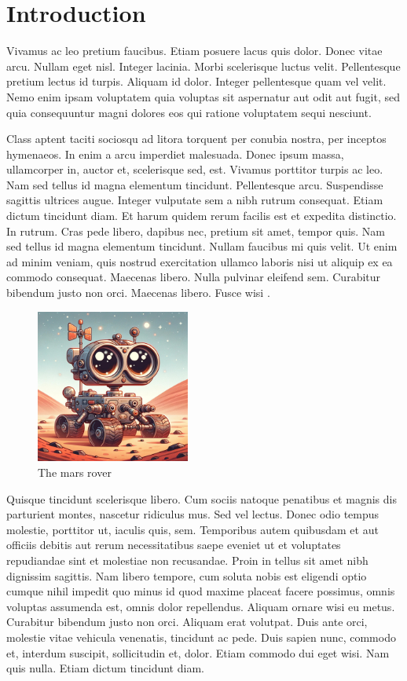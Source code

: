 \section{Introduction}

Vivamus ac leo pretium faucibus. Etiam posuere lacus quis dolor. Donec vitae arcu. Nullam eget nisl. Integer lacinia. Morbi scelerisque luctus velit. Pellentesque pretium lectus id turpis. Aliquam id dolor. Integer pellentesque quam vel velit. Nemo enim ipsam voluptatem quia voluptas sit aspernatur aut odit aut fugit, sed quia consequuntur magni dolores eos qui ratione voluptatem sequi nesciunt.

Class aptent taciti sociosqu ad litora torquent per conubia nostra, per inceptos hymenaeos. In enim a arcu imperdiet malesuada. Donec ipsum massa, ullamcorper in, auctor et, scelerisque sed, est. Vivamus porttitor turpis ac leo. Nam sed tellus id magna elementum tincidunt. Pellentesque arcu. Suspendisse sagittis ultrices augue. Integer vulputate sem a nibh rutrum consequat. Etiam dictum tincidunt diam. Et harum quidem rerum facilis est et expedita distinctio. In rutrum. Cras pede libero, dapibus nec, pretium sit amet, tempor quis. Nam sed tellus id magna elementum tincidunt. Nullam faucibus mi quis velit. Ut enim ad minim veniam, quis nostrud exercitation ullamco laboris nisi ut aliquip ex ea commodo consequat. Maecenas libero. Nulla pulvinar eleifend sem. Curabitur bibendum justo non orci. Maecenas libero. Fusce wisi \cite{kalman1960new}.

\begin{figure}[h]
    \centering
    \includegraphics[width=0.45\textwidth]{images/rover.jpg}
    \caption{The mars rover}
    \label{fig:mars_rover}
\end{figure}

Quisque tincidunt scelerisque libero. Cum sociis natoque penatibus et magnis dis parturient montes, nascetur ridiculus mus. Sed vel lectus. Donec odio tempus molestie, porttitor ut, iaculis quis, sem. Temporibus autem quibusdam et aut officiis debitis aut rerum necessitatibus saepe eveniet ut et voluptates repudiandae sint et molestiae non recusandae. Proin in tellus sit amet nibh dignissim sagittis. Nam libero tempore, cum soluta nobis est eligendi optio cumque nihil impedit quo minus id quod maxime placeat facere possimus, omnis voluptas assumenda est, omnis dolor repellendus. Aliquam ornare wisi eu metus. Curabitur bibendum justo non orci. Aliquam erat volutpat. Duis ante orci, molestie vitae vehicula venenatis, tincidunt ac pede. Duis sapien nunc, commodo et, interdum suscipit, sollicitudin et, dolor. Etiam commodo dui eget wisi. Nam quis nulla. Etiam dictum tincidunt diam. \cite{grisetti2010tutorial}
